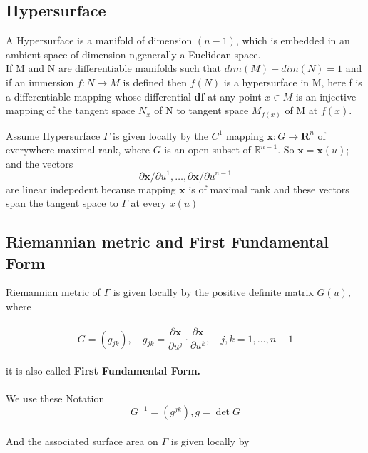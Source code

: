 \documentclass[oneside]{book}
\theoremstyle{definition}
\begin{document}
\subsection{Hypersurface}
\label{ss:5}



A Hypersurface is a manifold of dimension $(n-1)$, which is embedded in an ambient space of dimension n,generally a Euclidean space.
\\
    If M and N are differentiable manifolds such that $dim(M)-dim(N) = 1$ and if an immersion $f:N\rightarrow M$ is defined then $f(N)$ is a hypersurface in M, here f is a differentiable mapping whose differential \textbf{df} at any point  $x\in M$ is an injective mapping of the 
     tangent space $N_{x}$ of N to  tangent space $M_{f(x)}$ of M at $f(x)$.
    

    
    
       Assume  Hypersurface $\Gamma$ is given locally by the $C^{1}$ mapping $\mathbf{x}: G \rightarrow \mathbf{R}^{n}$ of everywhere
maximal rank, where $G$ is an open subset of $\mathbb{R}^{n-1} .$ So $\mathbf{x}=\mathbf{x}(u)$; and the vectors \\
$$
\partial \mathbf{x} / \partial u^{1}, \ldots, \partial \mathbf{x} / \partial u^{n-1} 
$$
are linear indepedent because  mapping $\mathbf{x}$ is of maximal rank and these vectors span the tangent space to $\Gamma$ at every $x(u)$\\







   


\subsection{Riemannian metric and First Fundamental Form}
\label{ss:6}
{Riemannian metric} of $\Gamma$ is given
locally by the positive definite matrix $G(u),$ where 
\\\\
  \begin{equation}
  \label{eq17}  
 G=\left(g_{j k}\right), \quad g_{j k}=\frac{\partial \mathbf{x}}{\partial u^{j}} \cdot \frac{\partial \mathbf{x}}{\partial u^{k}}, \quad j, k=1, \ldots, n-1     \end{equation}
\\
it is also called \textbf{First Fundamental Form.} \\\\
   We use these Notation \\
   \[ G^{-1}=\left(g^{j k}\right),   g=\operatorname{det}{G} \] \\
    And the associated surface area on  
   $\Gamma$ is given locally by \\
\end{document}
